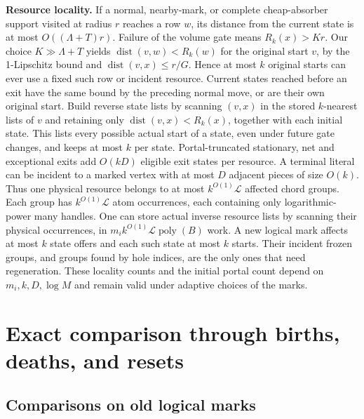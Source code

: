 \documentclass[11pt]{article}
\begin{document}
\textbf{Resource locality.} If a normal, nearby-mark, or complete cheap-absorber support visited at radius \(r\) reaches a row \(w\), its distance from the current state is at most \(O((\Lambda+T)r)\). Failure of the volume gate means \(R_k(x)>Kr\). Our choice \(K\gg\Lambda+T\) yields \(\operatorname{dist}(v,w)<R_k(w)\) for the original start \(v\), by the 1-Lipschitz bound and \(\operatorname{dist}(v,x)\le r/G\). Hence at most \(k\) original starts can ever use a fixed such row or incident resource. Current states reached before an exit have the same bound by the preceding normal move, or are their own original start. Build reverse state lists by scanning \((v,x)\) in the stored \(k\)-nearest lists of \(v\) and retaining only \(\operatorname{dist}(v,x)<R_k(x)\), together with each initial state. This lists every possible actual start of a state, even under future gate changes, and keeps at most \(k\) per state. Portal-truncated stationary, net and exceptional exits add \(O(kD)\) eligible exit states per resource. A terminal literal can be incident to a marked vertex with at most \(D\) adjacent pieces of size \(O(k)\). Thus one physical resource belongs to at most \(k^{O(1)}\mathcal L\) affected chord groups. Each group has \(k^{O(1)}\mathcal L\) atom occurrences, each containing only logarithmic-power many handles. One can store actual inverse resource lists by scanning their physical occurrences, in \(m_i k^{O(1)}\mathcal L\operatorname{poly}(B)\) work. A new logical mark affects at most \(k\) state offers and each such state at most \(k\) starts. Their incident frozen groups, and groups found by hole indices, are the only ones that need regeneration. These locality counts and the initial portal count depend on \(m_i,k,D,\log M\) and remain valid under adaptive choices of the marks.

\hypertarget{exact-comparison-through-births-deaths-and-resets}{%
\section{Exact comparison through births, deaths, and resets}\label{exact-comparison-through-births-deaths-and-resets}}

\hypertarget{comparisons-on-old-logical-marks}{%
\subsection{Comparisons on old logical marks}\label{comparisons-on-old-logical-marks}}
\end{document}
